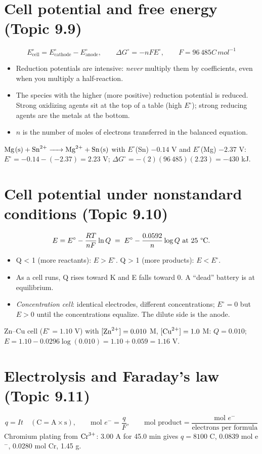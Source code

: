 \documentclass[11pt]{article}
\begin{document}
\section{Cell potential and free energy (Topic 9.9)}\label{t:9.9}
\[ E^\circ_{\text{cell}} = E^\circ_{\text{cathode}} - E^\circ_{\text{anode}}, \qquad \Delta G^\circ = -nFE^\circ, \qquad F = 96\,485\unit{C\,mol^{-1}} \]
\begin{itemize}
\item Reduction potentials are intensive: \emph{never} multiply them by coefficients, even when you multiply a half-reaction.
\item The species with the higher (more positive) reduction potential is reduced. Strong oxidizing agents sit at the top of a table (high $E^\circ$); strong reducing agents are the metals at the bottom.
\item $n$ is the number of moles of electrons transferred in the balanced equation.
\end{itemize}
 $\ce{Mg(s) + Sn^2+ -> Mg^2+ + Sn(s)}$ with $E^\circ$(Sn) $-0.14$ V and $E^\circ$(Mg) $-2.37$ V: $E^\circ = -0.14 - (-2.37) = 2.23$ V; $\Delta G^\circ = -(2)(96\,485)(2.23) = -430$ kJ.

\section{Cell potential under nonstandard conditions (Topic 9.10)}\label{t:9.10}
\[ E = E^\circ - \frac{RT}{nF}\ln Q \;=\; E^\circ - \frac{0.0592}{n}\log Q \text{ at 25 \textdegree C.} \]
\begin{itemize}
\item Q < 1 (more reactants): $E > E^\circ$. Q > 1 (more products): $E < E^\circ$.
\item As a cell runs, Q rises toward K and E falls toward 0. A ``dead'' battery is at equilibrium.
\item \emph{Concentration cell}: identical electrodes, different concentrations; $E^\circ = 0$ but $E > 0$ until the concentrations equalize. The dilute side is the anode.
\end{itemize}
 Zn--Cu cell ($E^\circ = 1.10$ V) with $[\ce{Zn^2+}] = 0.010$ M, $[\ce{Cu^2+}] = 1.0$ M: $Q = 0.010$; $E = 1.10 - 0.0296\log(0.010) = 1.10 + 0.059 = 1.16$ V.

\section{Electrolysis and Faraday's law (Topic 9.11)}\label{t:9.11}
\[ q = It \quad (\mathrm{C} = \mathrm{A} \times \mathrm{s}), \qquad \text{mol } e^- = \frac{q}{F}, \qquad \text{mol product} = \frac{\text{mol } e^-}{\text{electrons per formula}} \]
 Chromium plating from $\ce{Cr^3+}$: 3.00 A for 45.0 min gives $q = 8100$ C, 0.0839 mol e$^-$, 0.0280 mol Cr, 1.45 g.
\end{document}
